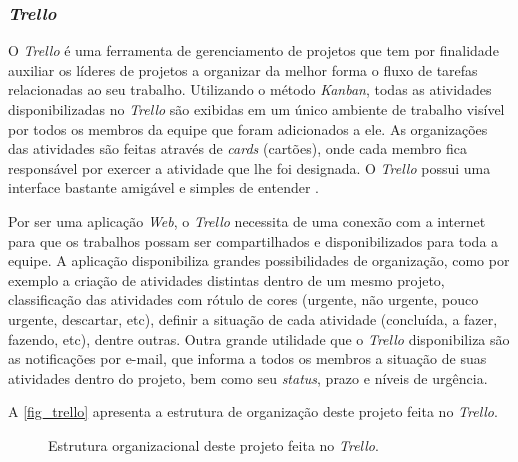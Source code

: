 \subsubsection{\textit{Trello}}
\label{trello}

O \textit{Trello} é uma ferramenta de gerenciamento de projetos que tem por finalidade auxiliar os líderes de projetos a organizar da melhor forma o fluxo de tarefas relacionadas ao seu trabalho. Utilizando o método \textit{Kanban}, todas as atividades disponibilizadas no \textit{Trello} são exibidas em um único ambiente de trabalho visível por todos os membros da equipe que foram adicionados a ele. As organizações das atividades são feitas através de \textit{cards} (cartões), onde cada membro fica responsável por exercer a atividade que lhe foi designada. O \textit{Trello } possui uma interface bastante amigável e simples de entender \cite{TRELLO2017}. 

Por ser uma aplicação \textit{Web}, o \textit{Trello} necessita de uma conexão com a internet para que os trabalhos possam ser compartilhados e disponibilizados para toda a equipe. A aplicação disponibiliza grandes possibilidades de organização, como por exemplo a criação de atividades distintas dentro de um mesmo projeto, classificação das atividades com rótulo de cores (urgente, não urgente, pouco urgente, descartar, etc), definir a situação de cada atividade (concluída, a fazer, fazendo, etc), dentre outras. Outra grande utilidade que o \textit{Trello} disponibiliza são as notificações por e-mail, que informa a todos os membros a situação de suas atividades dentro do projeto, bem como seu \textit{status}, prazo e níveis de urgência.

A \autoref{fig_trello} apresenta a estrutura de organização deste projeto feita no \textit{Trello}.

\begin{figure}[h]
	\caption{\label{fig_trello}Estrutura organizacional deste projeto feita no \textit{Trello}.}
	\begin{center}
	\end{center}
	\centering {}
\end{figure}